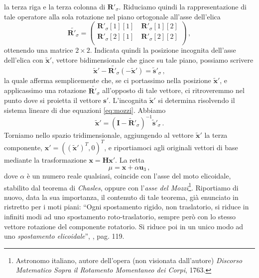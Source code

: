 la terza riga e la terza colonna di ${\bm R}'_{\sigma}$.
Riduciamo quindi la rappresentazione di tale operatore
alla sola rotazione nel piano ortogonale
all'asse dell'elica
\begin{equation}
\tilde{{\bm R}'_{\sigma}}=\left( \begin{array}{cc}
{\bm R}'_{\sigma}[1][1] & \
{\bm R}'_{\sigma}[1][2]\\
{\bm R}'_{\sigma}[2][1] & \
{\bm R}'_{\sigma}[2][2]\\
\end{array}
\right)
\,,
\label{eq:op_rot_2d}
\end{equation}
\noindent ottenendo una matrice $2\times2$.
Indicata quindi 
la posizione incognita dell'asse dell'elica con $\tilde{\bm x}'$, vettore 
bidimensionale che giace su tale piano,
possiamo scrivere
\begin{equation}
\tilde{\bm x}' - \tilde{{\bm R}'_{\sigma}}(-\tilde{\bm x}')={\tilde{{\bm s}}'}_{\sigma}\,,
\label{eq:mozzi}
\end{equation}
\noindent la quale afferma semplicemente che, se ci portassimo nella posizione
$\tilde{\bm x}'$, e applicassimo una rotazione $\tilde{{\bm R}'_{\sigma}}$ all'opposto
di tale vettore, ci ritroveremmo nel punto dove si proietta il vettore
${\bm s}'$. L'incognita $\tilde{{\bm x}}'$ si determina
risolvendo il sistema lineare di due equazioni \ref{eq:mozzi}. Abbiamo
\begin{equation}
\tilde{{\bm x}}'=({{\bm I} -\tilde{\bm R}'_{\sigma}})^{-1}{\tilde{{\bm s}}'}_{\sigma}\,.
\label{eq:sol_mozzi}
\end{equation}
\noindent Torniamo nello spazio tridimensionale, aggiungendo al 
vettore $\tilde{\bm x}'$ la terza componente,
${\bm x}'=((\tilde{\bm x}')^T,0)^T$, e riportiamoci agli originali vettori
di base mediante la trasformazione ${\bm x}={\bm H}{\bm x}'$.
La retta
\begin{equation}
\mu={\bm x} + \alpha {\bm u}_3\,,
\label{eq:asse_m}
\end{equation}
\noindent dove $\alpha$ \`e un numero reale qualsiasi,
coincide con l'asse del moto elicoidale, stabilito dal teorema
di {\em Chasles},
oppure con l'{\em asse del Mozzi}\index{asse!del Mozzi}\footnote
{
Astronomo italiano, autore dell'opera (non visionata dall'autore) {\em
Discorso Matematico Sopra il Rotamento Momentaneo dei Corpi}, 1763.
}.
Riportiamo di nuovo, data la sua importanza,
il contenuto di tale teorema,
 gi\`a enunciato in ristretto
per i moti piani: ``Ogni spostamento rigido, non traslatorio, si riduce in
infiniti modi ad uno spostamento roto-traslatorio, sempre per\`o con lo stesso
vettore rotazione del componente rotatorio. Si riduce poi in un unico modo 
ad uno {\em spostamento elicoidale}\index{spostamento!elicoidale}'', \cite{finzi}, pag. 119.


